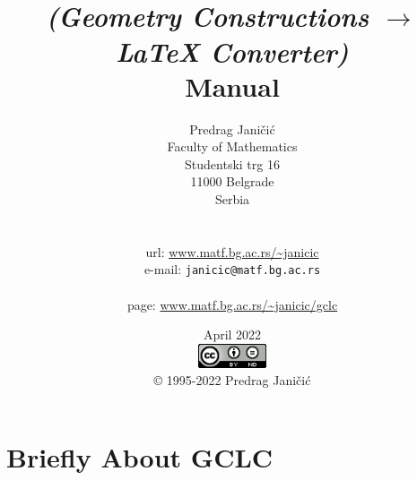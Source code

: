 \documentclass[a4paper]{book}
\title{\gclc 2022 \\ {\it (Geometry Constructions $\rightarrow$ \LaTeX{} Converter)} \\ 
{\bf Manua}l}
\author{Predrag Jani\v{c}i\'c \\
Faculty of Mathematics \\
Studentski trg 16 \\
11000 Belgrade \\
Serbia \\ \\ \\
{\sc url}:  \url{www.matf.bg.ac.rs/~janicic} \\
e-mail:  {\tt janicic@matf.bg.ac.rs} \\ \\
\gclc page:  \url{www.matf.bg.ac.rs/~janicic/gclc}}
\date{April 2022 \\ \vspace*{7cm}
\includegraphics[width=0.15\textwidth]{figures/CC-BY-ND.png} \\ 
\copyright{} 1995-2022 Predrag Jani\v{c}i\'c}
\newcommand{\gclc}{{\bfseries GCLC}\xspace}
\begin{document}
\maketitle

\tableofcontents

\pagestyle{fancyplain}
\renewcommand{\chaptermark}[1]{\markboth{\thechapter\ #1}{#1}}
\renewcommand{\sectionmark}[1]{\markright{\thesection\ #1}}
\lhead[\fancyplain{}{\bfseries\slshape\thepage}]{\fancyplain{}{\bfseries\slshape\rightmark}}
\rhead[\fancyplain{}{\bfseries\slshape\leftmark}]{\fancyplain{}{\bfseries\slshape\thepage}}
\cfoot{}


\chapter{Briefly About \gclc}
\end{document}
